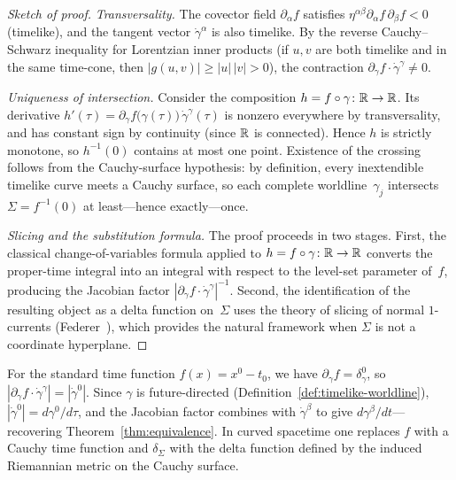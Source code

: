 \begin{proof}[Sketch of proof]
  \emph{Transversality.}\enspace
  The covector field $\partial_\alpha f$ satisfies
  $\eta^{\alpha\beta}\partial_\alpha f\,\partial_\beta f < 0$
  (timelike), and the tangent vector $\dot\gamma^\alpha$ is also
  timelike.  By the reverse Cauchy--Schwarz inequality for
  Lorentzian inner products (if $u,v$ are both
  timelike and in the same time-cone, then
  $|g(u,v)| \ge |u|\,|v| > 0$), the contraction
  $\partial_\gamma f \cdot \dot\gamma^\gamma \neq 0$.

  \emph{Uniqueness of intersection.}\enspace
  Consider the composition $h = f\circ\gamma\colon\mathbb{R}\to\mathbb{R}$.
  Its derivative $h'(\tau) = \partial_\gamma f\bigl(\gamma(\tau)\bigr)
  \,\dot\gamma^\gamma(\tau)$ is nonzero everywhere by
  transversality, and has constant sign by continuity (since
  $\mathbb{R}$ is connected).  Hence $h$ is strictly monotone, so
  $h^{-1}(0)$ contains at most one point.  Existence of the
  crossing follows from the Cauchy-surface hypothesis: by
  definition, every inextendible timelike curve meets a Cauchy
  surface, so each complete worldline~$\gamma_j$ intersects
  $\Sigma = f^{-1}(0)$ at least---hence exactly---once.

  \emph{Slicing and the substitution formula.}\enspace
  The proof proceeds in two stages.  First, the classical
  change-of-variables formula applied to
  $h = f\circ\gamma\colon\mathbb{R}\to\mathbb{R}$ converts the proper-time
  integral into an integral with respect to the level-set
  parameter of~$f$, producing the Jacobian factor
  $|\partial_\gamma f \cdot \dot\gamma^\gamma|^{-1}$.
  Second, the identification of the resulting object as a delta
  function on~$\Sigma$ uses the theory of slicing of normal
  $1$-currents (Federer~\cite[Theorem~4.3.2]{Federer69}), which
  provides the natural framework when $\Sigma$ is not a
  coordinate hyperplane.
\end{proof}

\begin{remark}
  For the standard time function $f(x) = x^0 - t_0$, we have
  $\partial_\gamma f = \delta_\gamma^0$, so
  $|\partial_\gamma f\cdot\dot\gamma^\gamma| = |\dot\gamma^0|$.
  Since $\gamma$ is future-directed
  (Definition~\ref{def:timelike-worldline}),
  $|\dot\gamma^0| = d\gamma^0/d\tau$, and the Jacobian factor
  combines with $\dot\gamma^\beta$ to give
  $d\gamma^\beta/dt$---recovering
  Theorem~\ref{thm:equivalence}.  In curved spacetime one
  replaces $f$ with a Cauchy time function and $\delta_\Sigma$
  with the delta function defined by the induced Riemannian metric
  on the Cauchy surface.
\end{remark}


